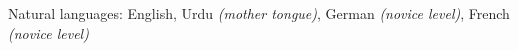 \inlineheadsection
  {Natural languages:}
  {English,
  Urdu \emph{(mother tongue)},
  German \emph{(novice level)},
  French \emph{(novice level)}
  }